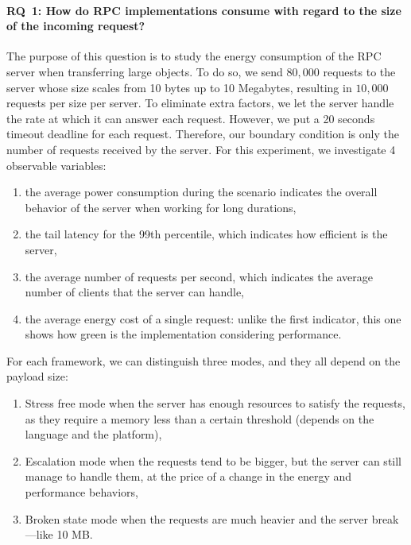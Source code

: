 \paragraph{\textsc{RQ}~1: How do RPC implementations consume with regard to the size of the incoming request?}
The purpose of this question is to study the energy consumption of the RPC server when transferring large objects.
To do so, we send $80,000$ requests to the server whose size scales from 10 bytes up to 10 Megabytes, resulting in $10,000$ requests per size per server.
To eliminate extra factors, we let the server handle the rate at which it can answer each request.
However, we put a 20 seconds timeout deadline for each request.
Therefore, our boundary condition is only the number of requests received by the server.
For this experiment, we investigate 4 observable variables:
\begin{enumerate}
    \item the \textsf{average power consumption} during the scenario indicates the overall behavior of the server when working for long durations,
    \item the \textsf{tail latency} for the 99th percentile, which indicates how efficient is the server,
    \item the \textsf{average number of requests per second}, which indicates the average number of clients that the server can handle,
    \item the \textsf{average energy cost} of a single request: unlike the first indicator, this one shows how green is the implementation considering performance.
\end{enumerate}

For each framework, we can distinguish three modes, and they all depend on the payload size:
\begin{enumerate}
    \item \textsf{Stress free} mode when the server has enough resources to satisfy the requests, as they require a memory less than a certain threshold (depends on the language and the platform),
    \item \textsf{Escalation} mode when the requests tend to be bigger, but the server can still manage to handle them, at the price of a change in the energy and performance behaviors,
    \item \textsf{Broken state} mode when the requests are much heavier and the server break—like 10 MB.%
\end{enumerate}


